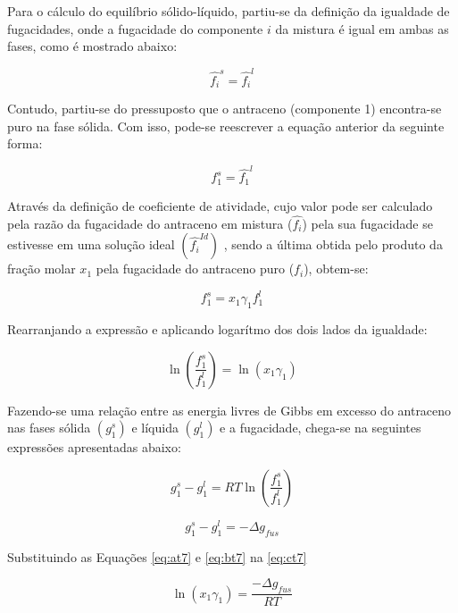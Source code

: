 Para o cálculo do equilíbrio sólido-líquido, partiu-se da definição da
igualdade de fugacidades, onde a fugacidade do componente $i$ da mistura é igual
em ambas as fases, como é mostrado abaixo:

\begin{equation}
\hat{f_i}^s = \hat{f_i}^l
\end{equation}

Contudo, partiu-se do pressuposto que o antraceno (componente 1) encontra-se
puro na fase sólida. Com isso, pode-se reescrever a equação anterior da seguinte
forma:

\begin{equation}
f_1^s = \hat{f_1}^l
\end{equation}

Através da definição de coeficiente de atividade, cujo valor pode ser
calculado pela razão da fugacidade do antraceno em mistura ($\hat{f_i}$) pela
sua fugacidade se estivesse em uma solução ideal $\left(\hat{f_i}^{Id}\right)$
, sendo a última obtida pelo produto da fração molar $x_1$ pela fugacidade do
antraceno puro ($f_i$), obtem-se:

\begin{equation}
f_1^s = x_1\gamma_1f_1^l
\end{equation}

Rearranjando a expressão e aplicando logarítmo dos dois lados da igualdade:

\begin{equation}\label{eq:ct7}
\ln \left( \frac{f_1^s}{f_1^l} \right) = \ln \left( x_1\gamma_1 \right)    
\end{equation}

Fazendo-se uma relação entre as energia livres de Gibbs em excesso do
antraceno nas fases sólida $\left(g_1^s\right)$ e líquida $\left(g_1^l\right)$ e
a fugacidade, chega-se na seguintes expressões apresentadas abaixo:

\begin{equation}\label{eq:at7}
g_1^s - g_1^l = RT\ln\left( \frac{f_1^s}{f_1^l} \right)   
\end{equation}

\begin{equation}\label{eq:bt7}
g_1^s - g_1^l = -\Delta g_{fus}  
\end{equation}

Substituindo as Equações \ref{eq:at7} e \ref{eq:bt7} na \autoref{eq:ct7}

\begin{equation}
\ln\left( x_1\gamma_1 \right) = \frac{-\Delta g_{fus}}{RT}
\end{equation}

